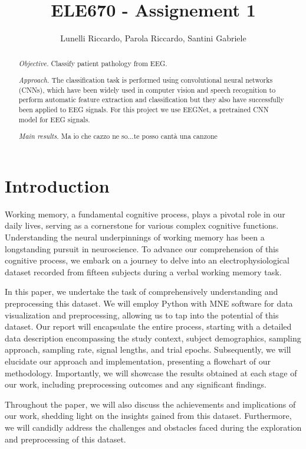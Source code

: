 \documentclass{article}
\title{ELE670 - Assignement 1}
\author{Lunelli Riccardo,
Parola Riccardo,
Santini Gabriele}
\begin{document}
\maketitle

\begin{abstract}
\textit{Objective.} Classify patient pathology from EEG. 

\textit{Approach.} The classification task is performed using convolutional neural networks (CNNs), which have been widely used in computer vision and speech recognition to perform automatic feature extraction and classification but they also have successfully been applied to EEG signals. For this project we use EEGNet, a pretrained CNN model for EEG signals.

\textit{Main results.} Ma io che cazzo ne so...te posso cantà una canzone
\end{abstract}
\section{Introduction}
Working memory, a fundamental cognitive process, plays a pivotal role in our daily lives, serving as a cornerstone for various complex cognitive functions. Understanding the neural underpinnings of working memory has been a longstanding pursuit in neuroscience. To advance our comprehension of this cognitive process, we embark on a journey to delve into an electrophysiological dataset recorded from fifteen subjects during a verbal working memory task. 

In this paper, we undertake the task of comprehensively understanding and preprocessing this dataset. We will employ Python with MNE software for data visualization and preprocessing, allowing us to tap into the potential of this  dataset. Our report will encapsulate the entire process, starting with a detailed data description encompassing the study context, subject demographics, sampling approach, sampling rate, signal lengths, and trial epochs. Subsequently, we will elucidate our approach and implementation, presenting a flowchart of our methodology. Importantly, we will showcase the results obtained at each stage of our work, including preprocessing outcomes and any significant findings.

Throughout the paper, we will also discuss the achievements and implications of our work, shedding light on the insights gained from this dataset. Furthermore, we will candidly address the challenges and obstacles faced during the exploration and preprocessing of this dataset.
\end{document}
